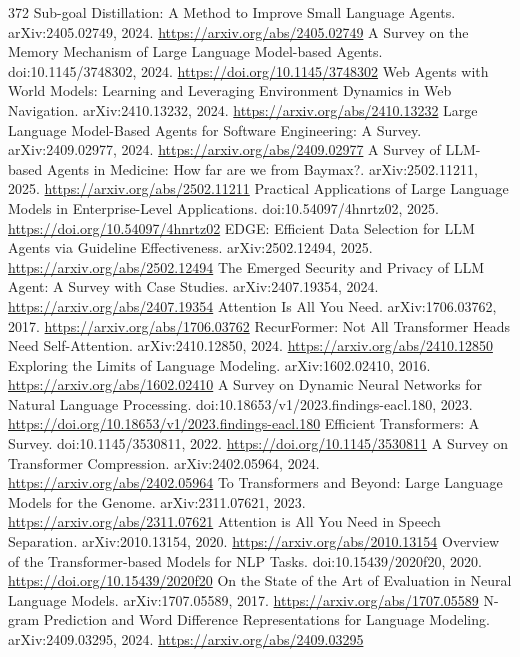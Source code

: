 \documentclass[11pt]{article}
\begin{document}
\begin{thebibliography}{372}
 Sub-goal Distillation: A Method to Improve Small Language Agents. arXiv:2405.02749, 2024. \url{https://arxiv.org/abs/2405.02749}
 A Survey on the Memory Mechanism of Large Language Model-based Agents. doi:10.1145/3748302, 2024. \url{https://doi.org/10.1145/3748302}
 Web Agents with World Models: Learning and Leveraging Environment Dynamics in Web Navigation. arXiv:2410.13232, 2024. \url{https://arxiv.org/abs/2410.13232}
 Large Language Model-Based Agents for Software Engineering: A Survey. arXiv:2409.02977, 2024. \url{https://arxiv.org/abs/2409.02977}
 A Survey of LLM-based Agents in Medicine: How far are we from Baymax?. arXiv:2502.11211, 2025. \url{https://arxiv.org/abs/2502.11211}
 Practical Applications of Large Language Models in Enterprise-Level Applications. doi:10.54097/4hnrtz02, 2025. \url{https://doi.org/10.54097/4hnrtz02}
 EDGE: Efficient Data Selection for LLM Agents via Guideline Effectiveness. arXiv:2502.12494, 2025. \url{https://arxiv.org/abs/2502.12494}
 The Emerged Security and Privacy of LLM Agent: A Survey with Case Studies. arXiv:2407.19354, 2024. \url{https://arxiv.org/abs/2407.19354}
 Attention Is All You Need. arXiv:1706.03762, 2017. \url{https://arxiv.org/abs/1706.03762}
 RecurFormer: Not All Transformer Heads Need Self-Attention. arXiv:2410.12850, 2024. \url{https://arxiv.org/abs/2410.12850}
 Exploring the Limits of Language Modeling. arXiv:1602.02410, 2016. \url{https://arxiv.org/abs/1602.02410}
 A Survey on Dynamic Neural Networks for Natural Language Processing. doi:10.18653/v1/2023.findings-eacl.180, 2023. \url{https://doi.org/10.18653/v1/2023.findings-eacl.180}
 Efficient Transformers: A Survey. doi:10.1145/3530811, 2022. \url{https://doi.org/10.1145/3530811}
 A Survey on Transformer Compression. arXiv:2402.05964, 2024. \url{https://arxiv.org/abs/2402.05964}
 To Transformers and Beyond: Large Language Models for the Genome. arXiv:2311.07621, 2023. \url{https://arxiv.org/abs/2311.07621}
 Attention is All You Need in Speech Separation. arXiv:2010.13154, 2020. \url{https://arxiv.org/abs/2010.13154}
 Overview of the Transformer-based Models for NLP Tasks. doi:10.15439/2020f20, 2020. \url{https://doi.org/10.15439/2020f20}
 On the State of the Art of Evaluation in Neural Language Models. arXiv:1707.05589, 2017. \url{https://arxiv.org/abs/1707.05589}
 N-gram Prediction and Word Difference Representations for Language Modeling. arXiv:2409.03295, 2024. \url{https://arxiv.org/abs/2409.03295}

\end{thebibliography}
\end{document}
